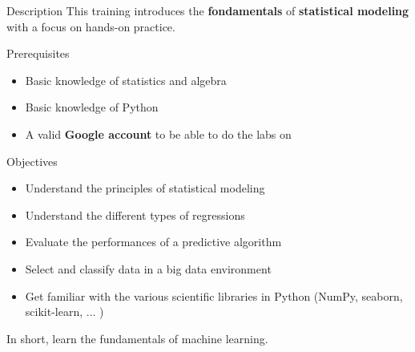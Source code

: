 \begin{frame}{Description}
  This training introduces the \textbf{fondamentals} of \textbf{statistical modeling} with a focus on hands-on practice.
\end{frame}

\begin{frame}{Prerequisites}
  \begin{itemize}
  \item Basic knowledge of statistics and algebra
  \item Basic knowledge of Python
  \item A valid \textbf{Google account} to be able to do the labs on 
  \end{itemize}
\end{frame}

\begin{frame}{Objectives}
  \begin{itemize}
  \item Understand the principles of statistical modeling
  \item Understand the different types of regressions
  \item Evaluate the performances of a predictive algorithm
  \item Select and classify data in a big data environment
  \item Get familiar with the various scientific libraries in Python (NumPy, seaborn, scikit-learn, ... )
  \end{itemize}
  In short, learn the fundamentals of machine learning.
\end{frame}
